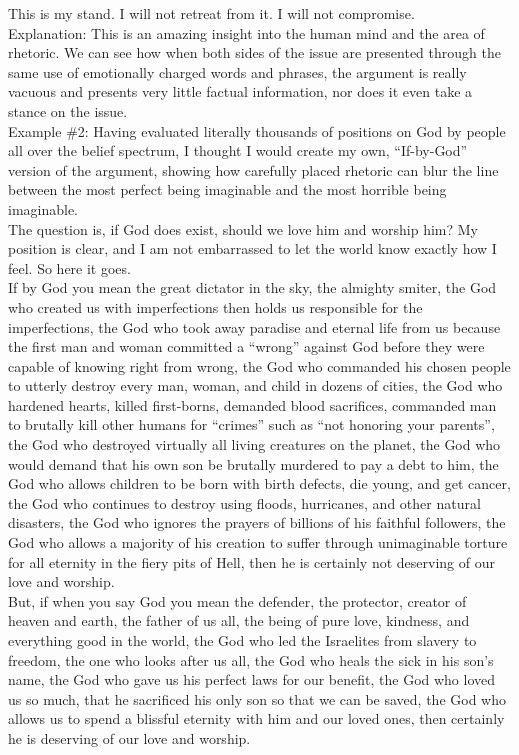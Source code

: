 \documentclass[a4paper,12pt,single,pdftex]{scrbook}
\begin{document}
    
      This is my stand. I will not retreat from it. I will not compromise.
    \\

    
      Explanation: This is an amazing insight into the human mind and the area of rhetoric.  We can see how when both sides of the issue are presented through the same use of emotionally charged words and phrases, the argument is really vacuous and presents very little factual information, nor does it even take a stance on the issue.
    \\

    
      Example \#2: Having evaluated literally thousands of positions on God by people all over the belief spectrum, I thought I would create my own, “If-by-God” version of the argument, showing how carefully placed rhetoric can blur the line between the most perfect being imaginable and the most horrible being imaginable.
    \\

    
      The question is, if God does exist, should we love him and worship him?  My position is clear, and I am not embarrassed to let the world know exactly how I feel.  So here it goes.
    \\

    
      If by God you mean the great dictator in the sky, the almighty smiter, the God who created us with imperfections then holds us responsible for the imperfections, the God who took away paradise and eternal life from us because the first man and woman committed a “wrong” against God before they were capable of knowing right from wrong, the God who commanded his chosen people to utterly destroy every man, woman, and child in dozens of cities, the God who hardened hearts, killed first-borns, demanded blood sacrifices, commanded man to brutally kill other humans for “crimes” such as “not honoring your parents”, the God who destroyed virtually all living creatures on the planet, the God who would demand that his own son be brutally murdered to pay a debt to him, the God who allows children to be born with birth defects, die young, and get cancer, the God who continues to destroy using floods, hurricanes, and other natural disasters, the God who ignores the prayers of billions of his faithful followers, the God who allows a majority of his creation to suffer through unimaginable torture for all eternity in the fiery pits of Hell, then he is certainly not deserving of our love and worship.
    \\

    
      But, if when you say God you mean the defender, the protector, creator of heaven and earth, the father of us all, the being of pure love, kindness, and everything good in the world, the God who led the Israelites from slavery to freedom, the one who looks after us all, the God who heals the sick in his son’s name, the God who gave us his perfect laws for our benefit, the God who loved us so much, that he sacrificed his only son so that we can be saved, the God who allows us to spend a blissful eternity with him and our loved ones, then certainly he is deserving of our love and worship.
    \\
\end{document}
